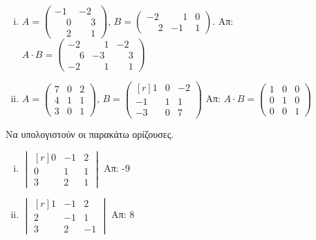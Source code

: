 \begin{enumerate}
\begin{enumerate}[i)]
\item $A=\begin{pmatrix}
-1 & -2 \\
\phantom{-}0 & \phantom{-}3 \\
\phantom{-}2 & \phantom{-}1 
\end{pmatrix}$,
\quad 
$B=\begin{pmatrix}
-2 & \phantom{-}1 & 0 \\
\phantom{-}2 & -1 & 1 
\end{pmatrix}$. \hfill Απ: $A\cdot B=\begin{pmatrix}
-2 & \phantom{-}1 & -2 \\
\phantom{-}6 & -3 & \phantom{-}3 \\
-2 & \phantom{-}1 & \phantom{-}1 
\end{pmatrix}$

\item $A = \begin{pmatrix*}
        7 & 0 & 2 \\
        4 & 1 & 1 \\
        3 & 0 & 1 
    \end{pmatrix*}$, 
    \quad
    $ B = \begin{pmatrix*}[r]
        1 & 0 & -2 \\
        -1 & 1 & 1 \\
        -3 & 0 & 7
        \end{pmatrix*} $ \hfill Απ: $ A \cdot B = \begin{pmatrix}
        1 & 0 & 0 \\
        0 & 1 & 0 \\
        0 & 0 & 1
    \end{pmatrix} $ 

\end{enumerate}

Να υπολογιστούν οι παρακάτω ορίζουσες.

\begin{enumerate}[i),itemsep=10pt]
  \item $\begin{vmatrix*}[r]
            0 & -1 & 2 \\
            0 & 1 & 1 \\
            3 & 2 & 1
        \end{vmatrix*}$ 
        \hfill Απ: -9

      \item $\begin{vmatrix*}[r]
            1 & -1 & 2 \\
            2 & -1 & 1 \\
            3 & 2 & -1 
        \end{vmatrix*}$
        \hfill Απ: 8 


\end{enumerate}
\end{enumerate}
